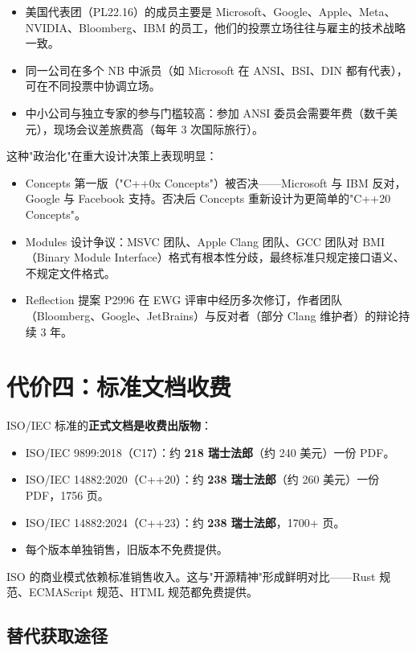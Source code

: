 \documentclass[12pt,a4paper,fontset=fandol]{ctexbook}
\newcommand{\yearlabel}[1]{%
  \tcbox[on line,colback=yearheadbg,colframe=yearheadbg,
    boxrule=0pt,arc=1pt,left=3pt,right=3pt,top=1pt,bottom=1pt,
    colupper=white,fontupper=\scriptsize\bfseries]{#1}}
\newcommand{\yrlbl}[1]{\yearlabel{#1}}
\begin{document}
\begin{itemize}
  \item 美国代表团（PL22.16）的成员主要是 Microsoft、Google、Apple、Meta、NVIDIA、Bloomberg、IBM 的员工，他们的投票立场往往与雇主的技术战略一致。
  \item 同一公司在多个 NB 中派员（如 Microsoft 在 ANSI、BSI、DIN 都有代表），可在不同投票中协调立场。
  \item 中小公司与独立专家的参与门槛较高：参加 ANSI 委员会需要年费（数千美元），现场会议差旅费高（每年 3 次国际旅行）。
\end{itemize}

这种"政治化"在重大设计决策上表现明显：

\begin{itemize}
  \item \yrlbl{2012} Concepts 第一版（"C++0x Concepts"）被否决——Microsoft 与 IBM 反对，Google 与 Facebook 支持。否决后 Concepts 重新设计为更简单的"C++20 Concepts"。
  \item \yrlbl{2018} Modules 设计争议：MSVC 团队、Apple Clang 团队、GCC 团队对 BMI（Binary Module Interface）格式有根本性分歧，最终标准只规定接口语义、不规定文件格式。
  \item \yrlbl{2020} Reflection 提案 P2996 在 EWG 评审中经历多次修订，作者团队（Bloomberg、Google、JetBrains）与反对者（部分 Clang 维护者）的辩论持续 3 年。
\end{itemize}

\section{代价四：标准文档收费}

ISO/IEC 标准的\textbf{正式文档是收费出版物}：

\begin{itemize}
  \item ISO/IEC 9899:2018（C17）：约 \textbf{218 瑞士法郎}（约 240 美元）一份 PDF。
  \item ISO/IEC 14882:2020（C++20）：约 \textbf{238 瑞士法郎}（约 260 美元）一份 PDF，1756 页。
  \item ISO/IEC 14882:2024（C++23）：约 \textbf{238 瑞士法郎}，1700+ 页。
  \item 每个版本单独销售，旧版本不免费提供。
\end{itemize}

ISO 的商业模式依赖标准销售收入。这与"开源精神"形成鲜明对比——Rust 规范、ECMAScript 规范、HTML 规范都免费提供。

\subsection{替代获取途径}
\end{document}

